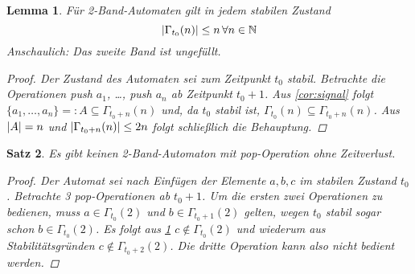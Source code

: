 \documentclass{article}
\theoremstyle{plain}%
\newtheorem{thm}{Satz}
\newtheorem{lem}[thm]{Lemma}
\theoremstyle{definition}
\theoremstyle{remark}
\begin{document}
\begin{lem}
    \label{lem:2tape-halffilled}
    Für 2-Band-Automaten gilt in jedem stabilen Zustand
    \[ \lvert\Gamma_{t_0}(n)\rvert \leq n \,\forall n \in \mathbb{N} \]
    Anschaulich: Das zweite Band ist ungefüllt.
    \begin{proof}
        Der Zustand des Automaten sei zum Zeitpunkt $t_0$ stabil. Betrachte die Operationen \emph{push $a_1$, \dots, push $a_n$} ab Zeitpunkt $t_0+1$. Aus \eqref{cor:signal} folgt $\{a_1, \dots, a_n\} =: A \subseteq \Gamma_{t_0+n}(n)$ und, da $t_0$ stabil ist, $\Gamma_{t_0}(n) \subseteq \Gamma_{t_0+n}(n)$. Aus $\lvert A\rvert = n$ und $\lvert\Gamma_{t_0+n}(n)\rvert \leq 2n$ folgt schließlich die Behauptung.
    \end{proof}
\end{lem}

\begin{thm} Es gibt keinen 2-Band-Automaton mit \emph{pop}-Operation ohne Zeitverlust.
    \begin{proof}
        Der Automat sei nach Einfügen der Elemente $a, b, c$ im stabilen Zustand $t_0$. Betrachte 3 \emph{pop}-Operationen ab $t_0+1$. Um die ersten zwei Operationen zu bedienen, muss $a \in \Gamma_{t_0}(2)$ und $b \in \Gamma_{t_0+1}(2)$ gelten, wegen $t_0$ stabil sogar schon $b \in \Gamma_{t_0}(2)$. Es folgt aus \ref{lem:2tape-halffilled} $c \notin \Gamma_{t_0}(2)$ und wiederum aus Stabilitätsgründen $c \notin \Gamma_{t_0+2}(2)$. Die dritte Operation kann also nicht bedient werden.
    \end{proof}
\end{thm}
\end{document}
